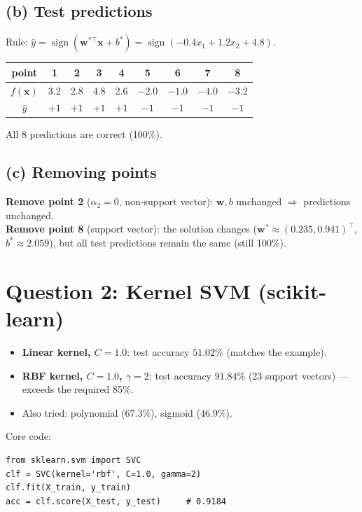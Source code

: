 \documentclass[11pt]{article}
\newcommand{\bx}{\mathbf{x}}
\newcommand{\bw}{\mathbf{w}}
\begin{document}
\subsection*{(b) Test predictions}

Rule: $\hat y=\operatorname{sign}(\bw^{*\top}\bx+b^*)=\operatorname{sign}(-0.4x_1+1.2x_2+4.8)$.

\begin{center}
\begin{tabular}{c|cccccccc}
\toprule
point & 1 & 2 & 3 & 4 & 5 & 6 & 7 & 8\\
\midrule
$f(\bx)$ & 3.2 & 2.8 & 4.8 & 2.6 & $-2.0$ & $-1.0$ & $-4.0$ & $-3.2$\\
$\hat y$ & $+1$ & $+1$ & $+1$ & $+1$ & $-1$ & $-1$ & $-1$ & $-1$\\
\bottomrule
\end{tabular}
\end{center}
All 8 predictions are correct (100\%).

\subsection*{(c) Removing points}

\textbf{Remove point 2} ($\alpha_2=0$, non-support vector): $\bw,b$ unchanged $\Rightarrow$
predictions unchanged.\\
\textbf{Remove point 8} (support vector): the solution changes
($\bw^*\approx(0.235,0.941)^{\top}$, $b^*\approx2.059$), but all test predictions remain the
same (still 100\%).

\section*{Question 2: Kernel SVM (scikit-learn)}

\begin{itemize}
\item \textbf{Linear kernel, $C=1.0$}: test accuracy $51.02\%$ (matches the example).
\item \textbf{RBF kernel, $C=1.0$, $\gamma=2$}: test accuracy $\mathbf{91.84\%}$ (23 support
vectors) --- exceeds the required 85\%.
\item Also tried: polynomial ($67.3\%$), sigmoid ($46.9\%$).
\end{itemize}

Core code:
\begin{verbatim}
from sklearn.svm import SVC
clf = SVC(kernel='rbf', C=1.0, gamma=2)
clf.fit(X_train, y_train)
acc = clf.score(X_test, y_test)     # 0.9184
\end{verbatim}
\end{document}
